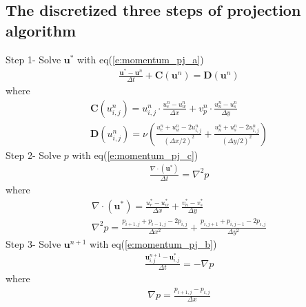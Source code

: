 \documentclass[11pt,dvips]{article}
\numberwithin{equation}{section}
\begin{document}
\subsection{The discretized three steps of projection algorithm}
Step 1- Solve $\mathbf{u}^{*}$ with eq(\ref{e:momentum_pj_a})
%
\begin{align}
\frac{\mathbf{u}^{*}-\mathbf{u}^{n}}{\Delta t}+\mathbf{C}(\mathbf{u}^{n})=
\mathbf{D}(\mathbf{u}^{{n}})  \nonumber
\end{align}
%
where
%
\begin{gather}
\mathbf{C}(u^n_{i,j})=u^n_{i,j} \cdot \frac{u^n_{e}-u^n_{w}}{\Delta x}+v^n_{p} 
\cdot \frac{u^n_{n}-u^n_{s}}{\Delta y} \\
\mathbf{D}(u^n_{i,j})=\nu (\frac{u^n_{e}+ u^n_{w}-2u^n_{i,j}}{(\Delta x/2)^2}
+\frac{u^n_{n}+ u^n_{s}-2u^n_{i,j}}{(\Delta y/2)^2})
\end{gather}
%
Step 2- Solve $p$ with eq(\ref{e:momentum_pj_c})
%
\begin{align}
\frac{\nabla \cdot(\mathbf{u}^{*})}{\Delta t}=\nabla ^2 p \nonumber
\end{align}
%
where
%
\begin{gather}
\nabla \cdot(\mathbf{u}^{*})=\frac{u^{*}_{e}-u^{*}_{w}}{\Delta x}
+\frac{v^{*}_{n}-v^{*}_{s}}{\Delta y} \\
\nabla ^2 p=\frac{p_{i+1,j}+p_{i-1,j}-2p_{i,j}}{\Delta x^2}+\frac{p_{i,j+1}
+p_{i,j-1}-2p_{i,j}}{\Delta y^2}
\end{gather}
%
Step 3- Solve $\mathbf{u}^{n+1}$ with eq(\ref{e:momentum_pj_b})
%
\begin{align}
\frac{\mathbf{u}^{n+1}_{i,j}-\mathbf{u}^{*}_{i,j}}{\Delta t}=-\nabla p \nonumber
\end{align}
%
where
%
\begin{align}
\nabla p=\frac{p_{i+1,j}-p_{i,j}}{\Delta x}
\end{align}

\clearpage


\end{document}
